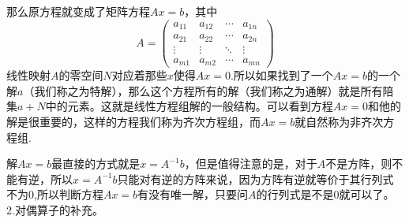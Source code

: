 \documentclass[11pt,a4paper,openany]{book}%
\theoremstyle{plain}%
\begin{document}
那么原方程就变成了矩阵方程$Ax=b$，其中
\[
A=
\begin{pmatrix}
a_{11} & a_{12} & \cdots & a_{1n} \\
a_{21} & a_{22} & \cdots & a_{2n} \\
\vdots & \vdots & \ddots & \vdots \\
a_{m1} & a_{m2} & \cdots & a_{mn}
\end{pmatrix}
\]
线性映射$A$的零空间$N$对应着那些$x$使得$Ax=0$.所以如果找到了一个$Ax=b$的一个解$a$（我们称之为{\kaishu 特解}），那么这个方程所有的解（我们称之为{\kaishu 通解}）就是所有陪集$a+N$中的元素。这就是线性方程组解的一般结构。可以看到方程$Ax=0$和他的解是很重要的，这样的方程我们称为{\kaishu 齐次方程组}，而$Ax=b$就自然称为{\kaishu 非齐次方程组}.

解$Ax=b$最直接的方式就是$x=A^{-1}b$，但是值得注意的是，对于$A$不是方阵，则不能有逆，所以$x=A^{-1}b$只能对有逆的方阵来说，因为方阵有逆就等价于其行列式不为0,所以判断方程$Ax=b$有没有唯一解，只要问$A$的行列式是不是0就可以了。\\

\noindent 2.对偶算子的补充。
\end{document}
